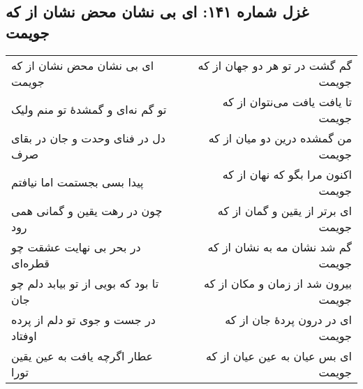 \begin{center}
\section*{غزل شماره ۱۴۱: ای بی نشان محض نشان از که جویمت}
\label{sec:141}
\begin{longtable}{l p{0.5cm} r}
ای بی نشان محض نشان از که جویمت
&&
گم گشت در تو هر دو جهان از که جویمت
\\
تو گم نه‌ای و گمشدهٔ تو منم ولیک
&&
تا یافت یافت می‌نتوان از که جویمت
\\
دل در فنای وحدت و جان در بقای صرف
&&
من گمشده درین دو میان از که جویمت
\\
پیدا بسی بجستمت اما نیافتم
&&
اکنون مرا بگو که نهان از که جویمت
\\
چون در رهت یقین و گمانی همی رود
&&
ای برتر از یقین و گمان از که جویمت
\\
در بحر بی نهایت عشقت چو قطره‌ای
&&
گم شد نشان مه به نشان از که جویمت
\\
تا بود که بویی از تو بیابد دلم چو جان
&&
بیرون شد از زمان و مکان از که جویمت
\\
در جست و جوی تو دلم از پرده اوفتاد
&&
ای در درون پردهٔ جان از که جویمت
\\
عطار اگرچه یافت به عین یقین تورا
&&
ای بس عیان به عین عیان از که جویمت
\\
\end{longtable}
\end{center}
